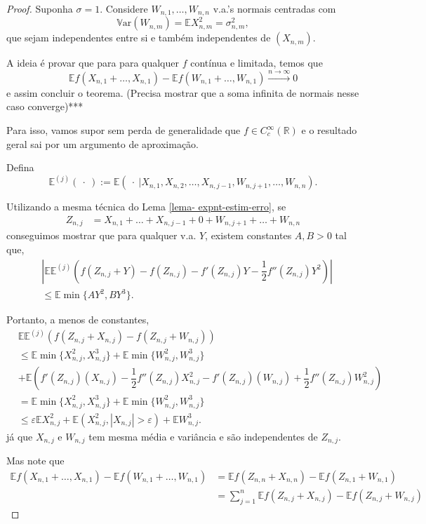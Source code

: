 \documentclass[12pt,a4paper,oneside]{book}
\theoremstyle{definition}
\theoremstyle{remark}
\numberwithin{equation}{section}
\newcommand{\R}{\mathbb{R}}
\newcommand{\e}{\varepsilon}
\newcommand{\E}{\mathbb{E}}
\newcommand{\Var}{\mathbb{V}\text{ar}}
\newcommand{\rarrowlimn}{\xrightarrow{n\rightarrow \infty}}
\begin{document}
 
\begin{proof}
Suponha $\sigma=1.$
Considere $W_{n,1},\dots,W_{n,n}$ v.a.'s normais centradas com 
$$\Var (W_{n,m}) = \E X^2_{n,m} = \sigma_{n,m}^2,$$ que sejam independentes entre si e também independentes de $(X_{n,m})$.

A ideia é provar que para para qualquer $f$ contínua e limitada, temos que 
$$\E f(X_{n,1}+\dots,X_{n,1}) -\E f(W_{n,1}+\dots,W_{n,1}) \rarrowlimn 0 $$
e assim concluir o teorema. (Precisa mostrar que a soma infinita de normais nesse caso converge)***

Para isso, vamos supor sem perda de generalidade que $f\in C^\infty_c(\R)$ e o resultado geral sai por um argumento de aproximação.
\bigskip


Defina 
$$\E^{(j)}(\ \cdot \ ):=\E(\ \cdot\  | X_{n,1},X_{n,2},\dots,X_{n,j-1},W_{n,j+1},\dots, W_{n,n}). $$

Utilizando a mesma técnica do Lema \ref{lema- expnt-estim-erro}, se
\begin{align*}
Z_{n,j}&= X_{n,1}+\dots+X_{n,j-1}+ 0 +W_{n,j+1} +\dots +W_{n,n}
\end{align*}
conseguimos mostrar que para qualquer v.a. $Y$,  existem constantes $A,B>0$ tal que, 
\begin{align*}
&\left|\E\E^{(j)}\left( f(Z_{n,j} + Y)-f(Z_{n,j}) -  f'(Z_{n,j})Y - \dfrac{1}{2}f''(Z_{n,j})Y^2 \right) \right|\\
&\leq \E\min\{A Y^2, BY^3  \}.
\end{align*}

Portanto, a menos de constantes,
\begin{align*}
&\E\E^{(j)}\left( f(Z_{n,j} + X_{n,j})-f(Z_{n,j}+ W_{n,j}) \right) \\
&\leq \E\min\{X_{n,j}^2, X_{n,j}^3  \}+\E\min\{ W_{n,j}^2, W_{n,j}^3  \}\\
& + \E \left( f'(Z_{n,j})(X_{n,j}) - \dfrac{1}{2}f''(Z_{n,j})X_{n,j}^2 - f'(Z_{n,j})(W_{n,j}) + \dfrac{1}{2}f''(Z_{n,j})W_{n,j}^2 \right)\\
& = \E\min\{X_{n,j}^2, X_{n,j}^3  \}+\E\min\{ W_{n,j}^2,W_{n,j}^3  \}\\
& \leq \e \E X_{n,j}^2 + \E (X_{n,j}^2, |X_{n,j}|>\e)+\E W_{n,j}^3.
\end{align*}
já que $X_{n,j}$ e $W_{n,j}$ tem mesma média e variância e são independentes de $Z_{n,j}.$

Mas note que
\begin{align*}
\E f(X_{n,1}+\dots,X_{n,1}) -\E f(W_{n,1}+\dots,W_{n,1}) &= \E f(Z_{n,n} + X_{n,n})-\E f(Z_{n,1} + W_{n,1})\\
& = \sum_{j=1}^n \E f(Z_{n,j} +X_{n,j}) -\E f(Z_{n,j} +W_{n,j})
\end{align*}
 


\end{proof}
\end{document}
